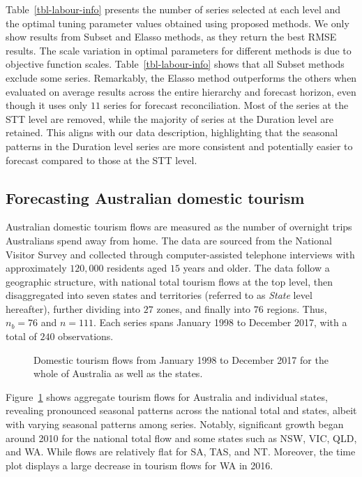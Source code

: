 \documentclass[
  11pt]{article}
\theoremstyle{plain}
\theoremstyle{remark}
\begin{document}
Table~\ref{tbl-labour-info} presents the number of series selected at
each level and the optimal tuning parameter values obtained using
proposed methods. We only show results from Subset and Elasso methods,
as they return the best RMSE results. The scale variation in optimal
parameters for different methods is due to objective function scales.
Table~\ref{tbl-labour-info} shows that all Subset methods exclude some
series. Remarkably, the Elasso method outperforms the others when
evaluated on average results across the entire hierarchy and forecast
horizon, even though it uses only \(11\) series for forecast
reconciliation. Most of the series at the STT level are removed, while
the majority of series at the Duration level are retained. This aligns
with our data description, highlighting that the seasonal patterns in
the Duration level series are more consistent and potentially easier to
forecast compared to those at the STT level.

\subsection{Forecasting Australian domestic tourism}\label{sec-tourism}

Australian domestic tourism flows are measured as the number of
overnight trips Australians spend away from home. The data are sourced
from the National Visitor Survey and collected through computer-assisted
telephone interviews with approximately \(120,000\) residents aged
\(15\) years and older. The data follow a geographic structure, with
national total tourism flows at the top level, then disaggregated into
seven states and territories (referred to as \emph{State} level
hereafter), further dividing into \(27\) zones, and finally into \(76\)
regions. Thus, \(n_b=76\) and \(n=111\). Each series spans January 1998
to December 2017, with a total of \(240\) observations.

\begin{figure}


\caption{\label{fig-tourism-data}Domestic tourism flows from January
1998 to December 2017 for the whole of Australia as well as the states.}

\end{figure}%

Figure~\ref{fig-tourism-data} shows aggregate tourism flows for
Australia and individual states, revealing pronounced seasonal patterns
across the national total and states, albeit with varying seasonal
patterns among series. Notably, significant growth began around 2010 for
the national total flow and some states such as NSW, VIC, QLD, and WA.
While flows are relatively flat for SA, TAS, and NT. Moreover, the time
plot displays a large decrease in tourism flows for WA in 2016.
\end{document}
